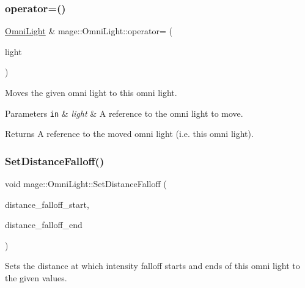 \subsubsection{\texorpdfstring{operator=()}{operator=()}\hspace{0.1cm}{\footnotesize\ttfamily [2/2]}}
{\footnotesize\ttfamily \hyperlink{classmage_1_1_omni_light}{Omni\+Light} \& mage\+::\+Omni\+Light\+::operator= (\begin{DoxyParamCaption}\item[{\hyperlink{classmage_1_1_omni_light}{Omni\+Light} \&\&}]{light }\end{DoxyParamCaption})\hspace{0.3cm}{\ttfamily [default]}}

Moves the given omni light to this omni light.


\begin{DoxyParams}[1]{Parameters}
\mbox{\tt in}  & {\em light} & A reference to the omni light to move. \\
\hline
\end{DoxyParams}
\begin{DoxyReturn}{Returns}
A reference to the moved omni light (i.\+e. this omni light). 
\end{DoxyReturn}
\hypertarget{classmage_1_1_omni_light_aa7a5fbf5cbf15199d6e5c6ef28b6ce84}{}\label{classmage_1_1_omni_light_aa7a5fbf5cbf15199d6e5c6ef28b6ce84} 
\subsubsection{\texorpdfstring{Set\+Distance\+Falloff()}{SetDistanceFalloff()}}
{\footnotesize\ttfamily void mage\+::\+Omni\+Light\+::\+Set\+Distance\+Falloff (\begin{DoxyParamCaption}\item[{\hyperlink{namespacemage_aa97e833b45f06d60a0a9c4fc22ae02c0}{F32}}]{distance\+\_\+falloff\+\_\+start,  }\item[{\hyperlink{namespacemage_aa97e833b45f06d60a0a9c4fc22ae02c0}{F32}}]{distance\+\_\+falloff\+\_\+end }\end{DoxyParamCaption})\hspace{0.3cm}{\ttfamily [noexcept]}}

Sets the distance at which intensity falloff starts and ends of this omni light to the given values.

